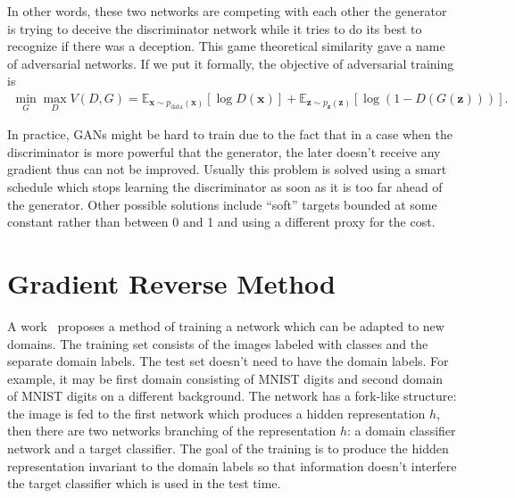\documentclass{article}
\begin{document}
    In other words, these two networks are competing with each other the 
    generator is trying to deceive the discriminator network while it tries
    to do its best to recognize if there was a deception. This game theoretical
    similarity gave a name of adversarial networks. If we put it formally, the 
    objective of adversarial training is
    \begin{align*}
        \min_G \max_D V(D, G) = \mathbb{E}_{\bm{x} \sim p_{\text{data}}(\bm{x})}[\log D(\bm{x})] + 
            \mathbb{E}_{\bm{z} \sim p_{\bm{z}}(\bm{z})}[\log (1 - D(G(\bm{z})))].
    \end{align*}


    In practice, GANs might be hard to train due to the fact that in a case when 
    the discriminator is more powerful that the generator, the later doesn't 
    receive any gradient thus can not be improved. Usually this problem is solved
    using a smart schedule which stops learning the discriminator as soon as it
    is too far ahead of the generator. Other possible solutions include ``soft''
    targets bounded at some constant rather than between 0 and 1 and using a 
    different proxy for the cost.

\section{Gradient Reverse Method}
\label{sec:gradient-reverse}

    A work~\cite{ganin2014unsupervised} proposes a method of training a network 
    which can be adapted to new domains. The training set consists of the images
    labeled with classes and the separate domain labels. The test set doesn't need
    to have the domain labels. For example, it may be first domain
    consisting of MNIST digits and second domain of MNIST digits on a different
    background. The network has a fork-like structure: the image is fed to the
    first network which produces a hidden representation $h$, then there are two
    networks branching of the representation $h$: a domain classifier network and 
    a target classifier. The goal of the training is to produce the hidden 
    representation invariant to the domain labels so that information doesn't 
    interfere the target classifier which is used in the test time.
\end{document}
